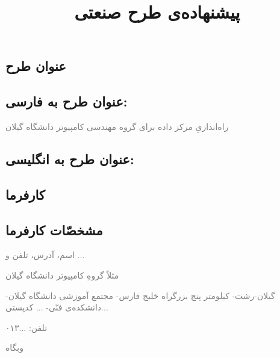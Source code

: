 \documentclass{article}
\begin{document}
\title{پیشنهاده‌ی طرح صنعتی}
\maketitle{}
\begin{framed}
	\section{عنوان طرح}
	\subsection{عنوان طرح به فارسی:}
	\textcolor{gray}{راه‌اندازیِ مرکز داده برای گروه مهندسی کامپیوتر دانشگاه گیلان}
	\subsection{عنوان طرح به انگلیسی:}
	\begin{flushleft}
	\textcolor{gray}{}
	\end{flushleft}
\end{framed}
\begin{framed}
	\section{کارفرما}
	\subsection{مشخصّات کارفرما}
	\textcolor{gray}{اسم، آدرس، تلفن و ...}

	\noindent \textcolor{gray}{مثلاً گروهِ کامپیوتر دانشگاه گیلان}

	\textcolor{gray}{گیلان-رشت- کیلومتر پنج بزرگراه خلیج فارس- مجتمع آموزشی دانشگاه گیلان- دانشکده‌ی فنّی- ... کدپستی...}

	\textcolor{gray}{تلفن: ...۰۱۳}
	
        \textcolor{gray}{وبگاه}
\end{framed}
\end{document}
